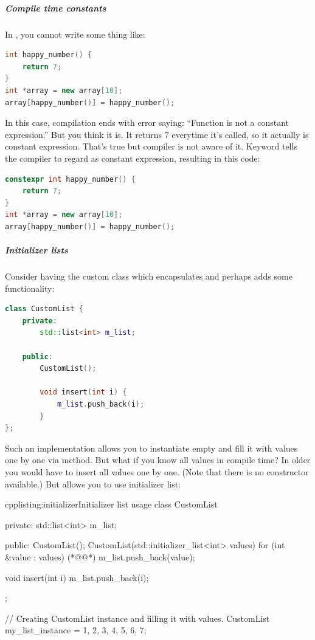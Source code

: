\subparagraph*{Compile time constants}
In , you cannot write some thing like:
\begin{lstlisting}[firstnumber=1,language=cpp]
int happy_number() {
	return 7;
}
int *array = new array[10];
array[happy_number()] = happy_number();
\end{lstlisting}
In this case, compilation ends with error saying: \enquote{Function  is not a constant expression.} But you think it is. It returns $7$ everytime it's called, so it actually is constant expression. That's true but compiler is not aware of it. Keyword tells the compiler to regard as constant expression, resulting in this code:
\begin{lstlisting}[firstnumber=1,language=cpp]
constexpr int happy_number() {
	return 7;
}
int *array = new array[10];
array[happy_number()] = happy_number();
\end{lstlisting}

\subparagraph*{Initializer lists}
Consider having the custom class which encapsulates and perhaps adds some functionality:
\begin{lstlisting}[firstnumber=1,language=cpp]
class CustomList {
	private:
		std::list<int> m_list;
	
	public:
		CustomList();
		
		void insert(int i) {
			m_list.push_back(i);		
		}
};
\end{lstlisting}
Such an implementation allows you to instantiate empty and fill it with values one by one via method. But what if you know all values in compile time? In older \cpp you would have to insert all values one by one. (Note that there is no constructor available.) But  allows you to use initializer list:
\begin{fdoccode}{cpp}{listing:initializer}{Initializer list usage}
class CustomList {
	private:
		std::list<int> m_list;
	
	public:
		CustomList();
		CustomList(std::initializer_list<int> values) {
			for (int &value : values) {(*@\label{listing:forloop}@*)
				m_list.push_back(value);			
			}
		}
		
		void insert(int i) {
			m_list.push_back(i);		
		}
};

// Creating CustomList instance and filling it with values.
CustomList my_list_instance = {1, 2, 3, 4, 5, 6, 7};
\end{fdoccode}

